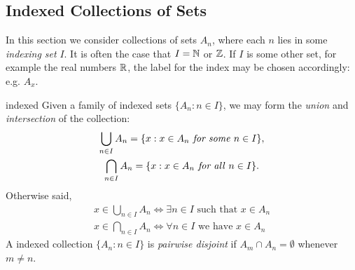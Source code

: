\begin{exercises}{}{}
\end{exercises}


\clearpage



\subsection{Indexed Collections of Sets}\label{sec:indexed}

In this section we consider collections of sets $A_n$, where each $n$ lies in some \emph{indexing set} $I$. It is often the case that $I=\mathbb{N}$ or $\mathbb{Z}$. If $I$ is some other set, for example the real numbers $\mathbb{R}$, the label for the index may be chosen accordingly: e.g. $A_x$.


\begin{defn}{}{indexed}
	Given a family of indexed sets $\{A_n:n\in I\}$, we may form the \emph{union} and \emph{intersection} of the collection:
	\begin{gather*}
		\bigcup_{n\in I}A_n=\{x:x\in A_n\text{\emph{ for some} }n\in I\},\\
		\bigcap_{n\in I}A_n=\{x:x\in A_n\text{\emph{ for all} }n\in I\}.
	\end{gather*}
	Otherwise said,
	\begin{gather*}
		x\in\bigcup_{n\in I}A_n\iff \exists n\in I\text{ such that }x\in A_n\\
		x\in\bigcap_{n\in I}A_n\iff \forall n\in I\text{ we have }x\in A_n
	\end{gather*}
	A indexed collection $\{A_n:n\in I\}$ is \emph{pairwise disjoint} if $A_m\cap A_n=\emptyset$ whenever $m\neq n$.
\end{defn}

